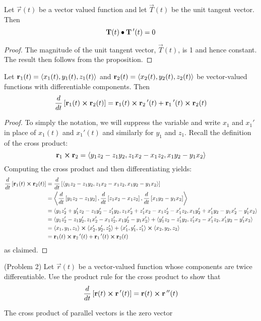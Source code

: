 \documentclass[handout]{ximera}
\begin{document}
\begin{corollary}
Let $\vec r(t)$ be a vector valued function and let $\vec T(t)$ be the unit tangent vector.
Then 
\[
\mathbf T(t) \bullet \mathbf T\,'(t) = 0
\]
\end{corollary}
\begin{proof}
The magnitude of the unit tangent vector, $\vec T(t)$, is 1 and hence constant. The result then follows from the proposition.
\end{proof}


\begin{proposition}
Let $\mathbf r_1(t) = \left\langle x_1(t), y_1(t),z_1(t)\right\rangle$ and $\mathbf r_2(t) = \left\langle x_2(t), y_2(t),z_2(t)\right\rangle$ be vector-valued functions with differentiable components.
Then
\[
\frac{d}{dt}\left[\mathbf r_1(t) \boldsymbol\times \mathbf r_2(t)\right] = \mathbf r_1(t) \boldsymbol\times \mathbf r_2\,'(t) + \mathbf r_1\,'(t) \boldsymbol\times \mathbf r_2(t)
\]
\end{proposition}
\begin{proof}
To simply the notation, we will suppress the variable and write $x_1$ and $x_1'$ in place of $x_1(t)$ and $x_1'(t)$ and similarly for $y_1$ and $z_1$.
Recall the definition of the cross product:
\[
\mathbf{r}_1 \boldsymbol\times \mathbf{r}_2 =  \left\langle y_1z_2 - z_1y_2, z_1x_2 - x_1z_2, x_1y_2 - y_1x_2\right\rangle
\]
Computing the cross product and then differentiating yields:
\begin{align*}
\frac{d}{dt}\left[\mathbf r_1(t) \boldsymbol\times \mathbf r_2(t)\right] &= \frac{d}{dt} \left[ \left\langle y_1z_2 - z_1y_2, z_1x_2 - x_1z_2, x_1y_2 - y_1x_2\right\rangle\right]\\
&=  \left\langle \frac{d}{dt} \left[y_1z_2 - z_1y_2\right], \frac{d}{dt} \left[z_1x_2 - x_1z_2\right],\frac{d}{dt} \left[x_1y_2 - y_1x_2\right]\right\rangle\\
&= \left\langle y_1z_2' + y_1'z_2- z_1y_2'  - z_1'y_2,  z_1x_2' + z_1'x_2- x_1z_2'  - x_1'z_2, x_1y_2' +x_1'y_2- y_1x_2'  - y_1'x_2      \right\rangle\\
&=\left\langle y_1z_2' - z_1y_2'  ,  z_1x_2' - x_1z_2', x_1y_2' - y_1x_2'\right\rangle+ \left\langle  y_1'z_2  - z_1'y_2, z_1'x_2 - x_1'z_2, x_1'y_2 - y_1'x_2\right\rangle\\
&= \left\langle x_1, y_1, z_1\right\rangle\boldsymbol\times \left\langle x_2', y_2', z_2'\right\rangle + \left\langle x_1', y_1', z_1'\right\rangle\boldsymbol\times \left\langle x_2, y_2, z_2\right\rangle\\
&= \mathbf r_1(t) \boldsymbol\times \mathbf r_2\,'(t) + \mathbf r_1\,'(t) \boldsymbol\times \mathbf r_2(t)
\end{align*}
as claimed.


\end{proof}

\begin{problem}(Problem 2)
Let $\vec r(t)$ be a vector-valued function whose components are twice differentiable. Use the product rule for the cross product to show that
\[
\frac{d}{dt}\left[\mathbf r(t) \boldsymbol\times \mathbf r\,'(t) \right] = \mathbf r(t) \boldsymbol\times \mathbf r\,''(t)
\]
\begin{hint}
The cross product of parallel vectors is the zero vector
\end{hint}
\end{problem}
\end{document}
